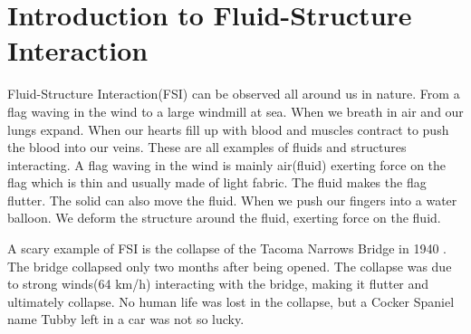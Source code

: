 \chapter{Introduction to Fluid-Structure Interaction}
Fluid-Structure Interaction(FSI) can be observed all around us in nature. From a flag waving in the wind to a large windmill at sea. 
When we breath in air and our lungs expand. When our hearts fill up with blood and muscles contract to push the blood into our veins. These are all examples of fluids and structures interacting. A flag waving in the wind is mainly air(fluid) exerting force on the flag which is thin and usually made of light fabric. The fluid makes the flag flutter. The solid can also move the fluid. When we push our fingers into a water balloon. We deform the structure around the fluid, exerting force on the fluid. \newline

A scary example of FSI is the collapse of the Tacoma Narrows Bridge in 1940 \cite{Billah1991}. The bridge collapsed only two months after being opened. The collapse was due to strong winds(64 km/h) interacting with the bridge, making it flutter and ultimately collapse. No human life was lost in the collapse, but a Cocker Spaniel name Tubby left in a car was not so lucky. \newline

